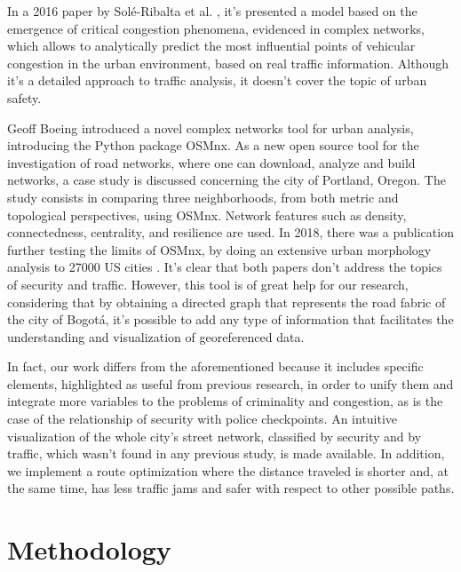 \documentclass[runningheads]{llncs}
\begin{document}
In a 2016 paper by Sol{\'e}-Ribalta et al. \cite{albert_model_2016}, it's presented a model based on the emergence of critical congestion phenomena, evidenced in complex networks, which allows to analytically predict the most influential points of vehicular congestion in the urban environment, based on real traffic information. Although it's a detailed approach to traffic analysis, it doesn't cover the topic of urban safety.

Geoff Boeing \cite{geoff_osmnx:_2017} introduced a novel complex networks tool for urban analysis, introducing the Python package OSMnx. As a new open source tool for the investigation of road networks, where one can download, analyze and build networks, a case study is discussed concerning the city of Portland, Oregon. The study consists in comparing three neighborhoods, from both metric and topological perspectives, using OSMnx. Network features such as density, connectedness, centrality, and resilience are used. In 2018, there was a publication further testing the limits of OSMnx, by doing an extensive urban morphology analysis to 27000 US cities \cite{boeing_multi-scale_2018}. It's clear that both papers don't address the topics of security and traffic. However, this tool is of great help for our research, considering that by obtaining a directed graph that represents the road fabric of the city of Bogotá, it's possible to add any type of information that facilitates the understanding and visualization of georeferenced data.

In fact, our work differs from the aforementioned because it includes specific elements, highlighted as useful from previous research, in order to unify them and integrate more variables to the problems of criminality and congestion, as is the case of the relationship of security with police checkpoints. An intuitive visualization of the whole city's street network, classified by security and by traffic, which wasn't found in any previous study, is made available. In addition, we implement a route optimization where the distance traveled is shorter and, at the same time, has less traffic jams and safer with respect to other possible paths.


\section{Methodology}
\end{document}
